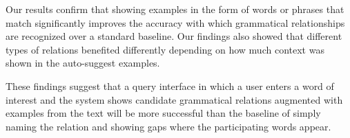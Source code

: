 Our results confirm that showing examples in the form of words or phrases that match significantly improves the accuracy with which grammatical relationships are recognized over a standard baseline.  Our findings also showed that different types of relations benefited differently depending on how much context was shown in the auto-suggest examples.

These findings suggest that a query interface in which a user enters a word of interest and the system shows candidate grammatical relations augmented with examples from the text will be more successful than the baseline of simply naming the relation and showing gaps where the participating words appear.

%
%
